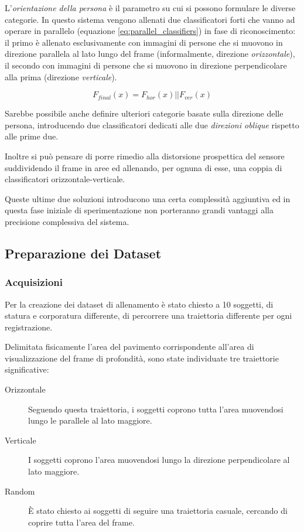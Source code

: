                 L'\emph{orientazione della persona} è il parametro su cui si possono formulare le diverse categorie.
                In questo sistema vengono allenati due classificatori forti che vanno ad operare in parallelo (equazione \ref{eq:parallel_classifiers}) in fase di riconoscimento: il primo è allenato esclusivamente con immagini di persone che si muovono in direzione parallela al lato lungo del frame (informalmente, direzione \emph{orizzontale}), il secondo con immagini di persone che si muovono in direzione perpendicolare alla prima (direzione \emph{verticale}).

                \begin{equation}
                    \label{eq:parallel_classifiers}
                    F_{final}(x) = F_{hor}(x) || F_{ver}(x)
                \end{equation}

                Sarebbe possibile anche definire ulteriori categorie basate sulla direzione delle persona, introducendo due classificatori dedicati alle due \emph{direzioni oblique} rispetto alle prime due.

                Inoltre si può pensare di porre rimedio alla distorsione prospettica del sensore suddividendo il frame in aree ed allenando, per ognuna di esse, una coppia di classificatori orizzontale-verticale.

                Queste ultime due soluzioni introducono una certa complessità aggiuntiva ed in questa fase iniziale di sperimentazione non porteranno grandi vantaggi alla precisione complessiva del sistema.

        \subsection{Preparazione dei Dataset}
        \label{sub:datasets_setup}
            \subsubsection{Acquisizioni}
                Per la creazione dei dataset di allenamento è stato chiesto a 10 soggetti, di statura e corporatura differente, di percorrere una traiettoria differente per ogni registrazione.

                Delimitata fisicamente l'area del pavimento corrispondente all'area di visualizzazione del frame di profondità, sono state individuate tre traiettorie significative:

                \begin{description}
                    \item[Orizzontale] Seguendo questa traiettoria, i soggetti coprono tutta l'area muovendosi lungo le parallele al lato maggiore.

                    \item[Verticale] I soggetti coprono l'area muovendosi lungo la direzione perpendicolare al lato maggiore.

                    \item[Random] È stato chiesto ai soggetti di seguire una traiettoria casuale, cercando di coprire tutta l'area del frame.
                \end{description}

